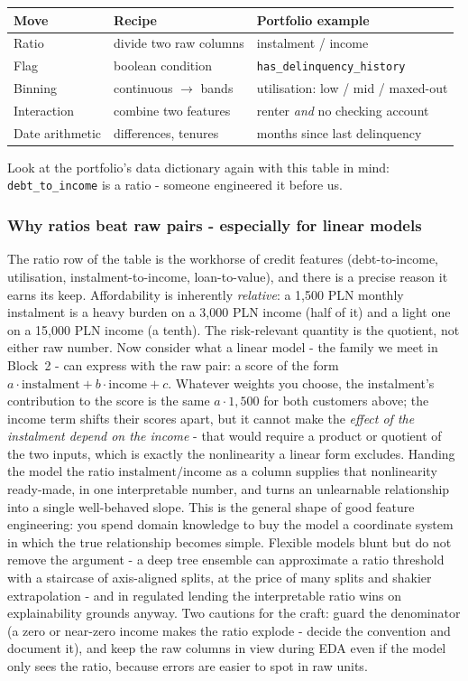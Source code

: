 \documentclass[11pt,a4paper]{article}
\begin{document}
\begin{center}\small
\begin{tabular}{@{}llp{5.2cm}@{}}
\toprule
Move & Recipe & Portfolio example \\
\midrule
Ratio & divide two raw columns & instalment / income \\
Flag & boolean condition & \texttt{has\_delinquency\_history} \\
Binning & continuous $\to$ bands & utilisation: low / mid / maxed-out \\
Interaction & combine two features & renter \emph{and} no checking account \\
Date arithmetic & differences, tenures & months since last delinquency \\
\bottomrule
\end{tabular}
\end{center}

Look at the portfolio's data dictionary again with this table in mind:
\texttt{debt\_to\_income} is a ratio - someone engineered it before us.

\subsubsection{Why ratios beat raw pairs - especially for linear models}
The ratio row of the table is the workhorse of credit features
(debt-to-income, utilisation, instalment-to-income, loan-to-value), and
there is a precise reason it earns its keep. Affordability is inherently
\emph{relative}: a 1{,}500 PLN monthly instalment is a heavy burden on a
3{,}000 PLN income (half of it) and a light one on a 15{,}000 PLN income
(a tenth). The risk-relevant quantity is the quotient, not either raw
number. Now consider what a linear model - the family we meet in
Block~2 - can express with the raw pair: a score of the form
$a \cdot \text{instalment} + b \cdot \text{income} + c$. Whatever weights
you choose, the instalment's contribution to the score is the same
$a \cdot 1{,}500$ for both customers above; the income term shifts their
scores apart, but it cannot make the \emph{effect of the instalment
depend on the income} - that would require a product or quotient of the
two inputs, which is exactly the nonlinearity a linear form excludes.
Handing the model the ratio $\text{instalment}/\text{income}$ as a column
supplies that nonlinearity ready-made, in one interpretable number, and
turns an unlearnable relationship into a single well-behaved slope. This
is the general shape of good feature engineering: you spend domain
knowledge to buy the model a coordinate system in which the true
relationship becomes simple. Flexible models blunt but do not remove the
argument - a deep tree ensemble can approximate a ratio threshold with a
staircase of axis-aligned splits, at the price of many splits and shakier
extrapolation - and in regulated lending the interpretable ratio wins on
explainability grounds anyway. Two cautions for the craft: guard the
denominator (a zero or near-zero income makes the ratio explode - decide
the convention and document it), and keep the raw columns in view during
EDA even if the model only sees the ratio, because errors are easier to
spot in raw units.
\end{document}
